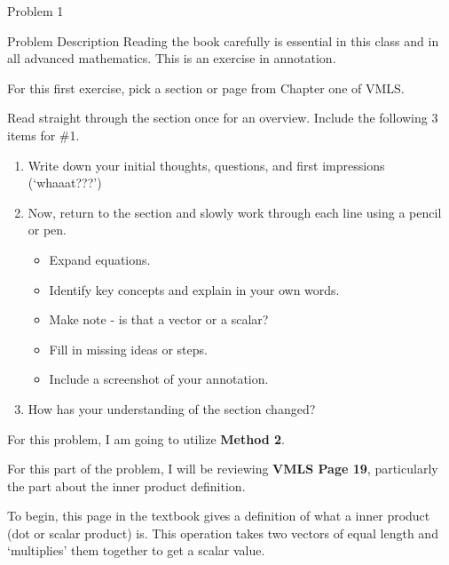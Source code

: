 \begin{problem}{Problem 1}
    \begin{statement}{Problem Description}
        Reading the book carefully is essential in this class and in all advanced mathematics. This is an exercise in annotation.

        For this first exercise, pick a section or page from Chapter one of VMLS. \vspace*{1em}

        Read straight through the section once for an overview. Include the following 3 items for \#1.

        \begin{enumerate}[label=(\alph*)]
            \item Write down your initial thoughts, questions, and first impressions (‘whaaat???’)
            \item Now, return to the section and slowly work through each line using a pencil or pen.
            \begin{itemize}
                \item Expand equations.
                \item Identify key concepts and explain in your own words.
                \item Make note - is that a vector or a scalar?
                \item Fill in missing ideas or steps.
                \item Include a screenshot of your annotation.
            \end{itemize}
            \item How has your understanding of the section changed?
        \end{enumerate}
    \end{statement}

    
    \begin{Highlight}
        For this problem, I am going to utilize \textbf{Method 2}. \vspace*{1em}

        For this part of the problem, I will be reviewing \textbf{VMLS Page 19}, particularly the part about the inner product definition.

        To begin, this page in the textbook gives a definition of what a inner product (dot or scalar product) is. This operation takes two vectors of equal length and `multiplies' them together
        to get a scalar value. 
        

\end{Highlight}
\end{problem}
